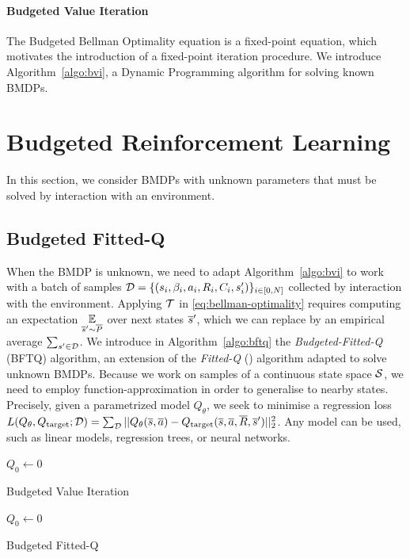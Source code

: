 \documentclass{article}
\begin{document}
\paragraph{Budgeted Value Iteration}

The Budgeted Bellman Optimality equation is a fixed-point equation, which motivates the introduction of a fixed-point iteration procedure. We introduce Algorithm~\ref{algo:bvi}, a Dynamic Programming algorithm for solving known BMDPs.

\section{Budgeted Reinforcement Learning}

In this section, we consider BMDPs with unknown parameters that must be solved by interaction with an environment. 

\subsection{Budgeted Fitted-Q}

When the BMDP is unknown, we need to adapt Algorithm~\ref{algo:bvi} to work with a batch of samples $\mathcal{D}=\{(s_i,\beta_i,a_i,R_i,C_i,s_i')\}_{i\in [0,N]}$ collected by interaction with the environment. Applying $\mathcal{T}$ in \eqref{eq:bellman-optimality} requires computing an expectation $\operatorname*{\mathbb{E}}\limits_{\overline{s}'\sim \overline{P}}$ over next states $\overline{s}'$, which we can replace by an empirical average $\sum_{s'\in\mathcal{D}}$.
We introduce in Algorithm~\ref{algo:bftq} the \emph{Budgeted-Fitted-Q} (BFTQ) algorithm, an extension of the \emph{Fitted-Q} (\FTQ) algorithm \citep{Ernst2005,Riedmiller2005} adapted to solve unknown BMDPs. 
Because we work on samples of a continuous state space $\mathcal{S}$, we need to employ function-approximation in order to generalise to nearby states. Precisely, given a parametrized model $Q_\theta$, we seek to minimise a regression loss $L(Q_\theta, Q_\text{target};\mathcal{D}) = \sum_{\mathcal{D}} ||Q_\theta(\overline{s}, \overline{a}) - Q_\text{target}(\overline{s}, \overline{a}, \overline{R}, \overline{s}')||_2^2$.
Any model can be used, such as linear models, regression trees, or neural networks.

\begin{minipage}[t]{0.5\textwidth}
\vspace{0pt}  
\begin{algorithm}[H]
\label{algo:bvi}
\DontPrintSemicolon
{}
$Q_{0} \leftarrow 0$\;
\caption{Budgeted Value Iteration}
\end{algorithm}
\end{minipage}%
\begin{minipage}[t]{0.5\textwidth}
\vspace{0pt}
\begin{algorithm}[H]
\label{algo:bftq}
\DontPrintSemicolon
\KwData{$\cD$}
$Q_{0} \leftarrow 0$\;
\caption{Budgeted Fitted-Q}
\end{algorithm}
\end{minipage}
\end{document}
